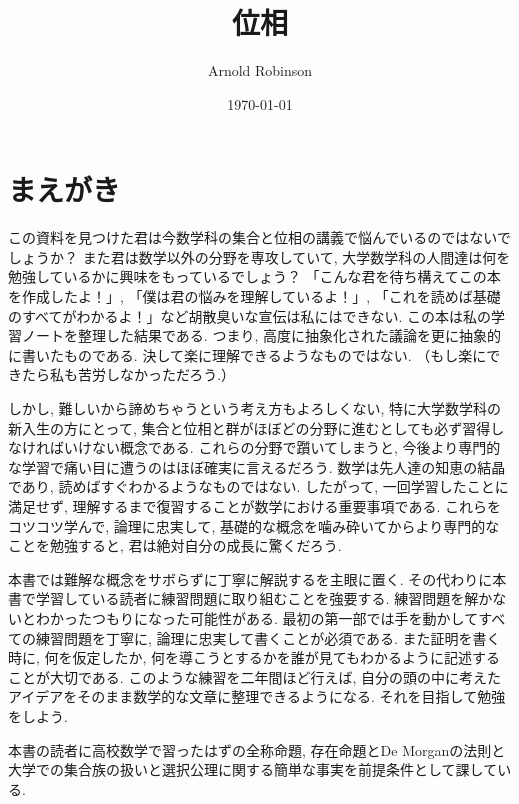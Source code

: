 \documentclass[lualatex]{ltjsbook}
\theoremstyle{remark}
\theoremstyle{plain}
\begin{document}
\title{位相}
\author{Arnold Robinson}
\date{\today}
\maketitle

\chapter*{まえがき}

この資料を見つけた君は今数学科の集合と位相の講義で悩んでいるのではないでしょうか？
また君は数学以外の分野を専攻していて, 大学数学科の人間達は何を勉強しているかに興味をもっているでしょう？ 
「こんな君を待ち構えてこの本を作成したよ！」, 「僕は君の悩みを理解しているよ！」, 「これを読めば基礎のすべてがわかるよ！」など胡散臭いな宣伝は私にはできない. 
この本は私の学習ノートを整理した結果である. つまり, 高度に抽象化された議論を更に抽象的に書いたものである. 決して楽に理解できるようなものではない. （もし楽にできたら私も苦労しなかっただろう.）



しかし, 難しいから諦めちゃうという考え方もよろしくない, 特に大学数学科の新入生の方にとって, 集合と位相と群がほぼどの分野に進むとしても必ず習得しなければいけない概念である. これらの分野で躓いてしまうと,
今後より専門的な学習で痛い目に遭うのはほぼ確実に言えるだろう. 
数学は先人達の知恵の結晶であり, 読めばすぐわかるようなものではない. したがって, 一回学習したことに満足せず, 理解するまで復習することが数学における重要事項である. これらをコツコツ学んで, 論理に忠実して, 基礎的な概念を噛み砕いてからより専門的なことを勉強すると, 君は絶対自分の成長に驚くだろう.



本書では難解な概念をサボらずに丁寧に解説するを主眼に置く. その代わりに本書で学習している読者に練習問題に取り組むことを強要する. 練習問題を解かないとわかったつもりになった可能性がある. 最初の第一部では手を動かしてすべての練習問題を丁寧に, 論理に忠実して書くことが必須である. また証明を書く時に, 何を仮定したか, 何を導こうとするかを誰が見てもわかるように記述することが大切である. このような練習を二年間ほど行えば, 自分の頭の中に考えたアイデアをそのまま数学的な文章に整理できるようになる. それを目指して勉強をしよう.

本書の読者に高校数学で習ったはずの全称命題, 存在命題とDe Morganの法則と大学での集合族の扱いと選択公理に関する簡単な事実を前提条件として課している.



\tableofcontents
{}
\end{document}
